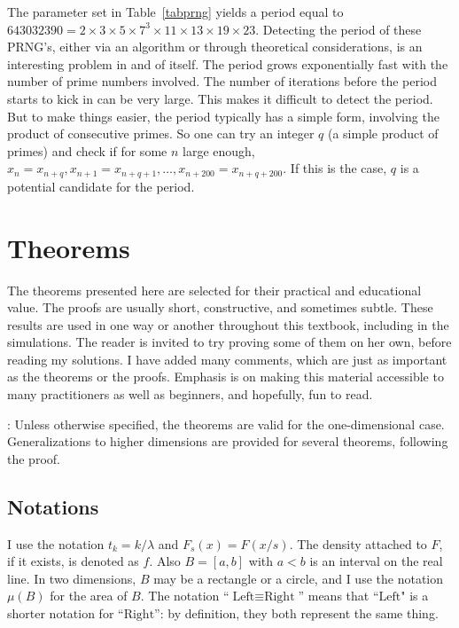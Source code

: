 \documentclass[10pt]{article}
\begin{document}
\noindent The parameter set in Table~\ref{tabprng} yields a
period equal to $\num{643032390}=2\times3\times5\times7^3\times11\times13\times19\times23$. Detecting the period of these PRNG's, either via an algorithm or through theoretical considerations, is an interesting problem in and of itself. The period grows exponentially fast with the number of prime numbers involved. The number of iterations before the period starts to kick in can be very large. This makes it difficult to detect the period. But to make things easier, the period typically has a simple form, involving the product of consecutive primes. So one can try an integer $q$  (a simple product of primes) and check if for some $n$ large enough, $x_n = x_{n+q}, x_{n+1}=x_{n+q+1},\dots,
x_{n+200}=x_{n+q+200}$. If this is the case, $q$ is a potential candidate for the period.


\section{Theorems}\label{sthm}

The theorems presented here are selected for their practical and educational value. The proofs are usually short, constructive, and sometimes subtle. These results are used in one way or another throughout this textbook, including in the simulations. The reader is invited to try proving some of them on her own, before reading my solutions. I have added many comments, which are just as important as the theorems or the proofs. Emphasis is on making this material accessible to many practitioners as well as beginners, and hopefully, fun to read.

: Unless otherwise specified, the theorems are valid for the one-dimensional case. Generalizations to higher dimensions are provided for several theorems,
following the proof.


\subsection{Notations}

I use the notation $t_k=k/\lambda$ and $F_s(x) = F(x/s)$. The density attached to $F$, if it exists, is denoted as $f$. Also $B=[a, b]$ with $a<b$ is an interval on the  real line. In two dimensions, $B$ may be a rectangle or a circle, and I use the notation $\mu(B)$ for the area of $B$. The notation ``$\mbox{Left} \equiv \mbox{Right}$'' means that ``$\mbox{Left}$" is a shorter notation for ``$\mbox{Right}$'': by definition, they both represent the same thing.
\end{document}

